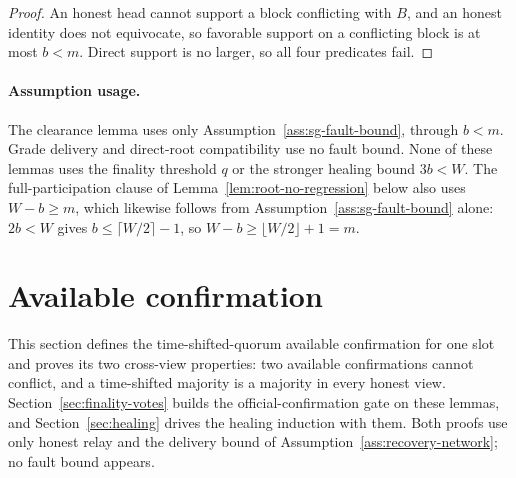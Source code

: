 \begin{proof}
An honest head cannot support a block conflicting with \(B\), and an
honest identity does not equivocate, so favorable support on a conflicting
block is at most \(b<m\).  Direct support is no larger, so all four
predicates fail.
\end{proof}

\paragraph{Assumption usage.}
The clearance lemma uses only
Assumption~\ref{ass:sg-fault-bound}, through \(b<m\).  Grade delivery and
direct-root compatibility use no fault bound.  None of these lemmas uses
the finality threshold \(q\) or the stronger healing bound \(3b<W\).
The full-participation clause of
Lemma~\ref{lem:root-no-regression} below also uses
\(W-b\geq m\), which likewise follows from
Assumption~\ref{ass:sg-fault-bound} alone: \(2b<W\) gives
\(b\leq\lceil W/2\rceil-1\), so
\(W-b\geq\lfloor W/2\rfloor+1=m\).

\section{Available confirmation}\label{sec:available-confirmation}

This section defines the time-shifted-quorum available confirmation for one
slot and proves its two cross-view properties: two available confirmations
cannot conflict, and a time-shifted majority is a majority in every honest
view.  Section~\ref{sec:finality-votes} builds the official-confirmation
gate on these lemmas, and Section~\ref{sec:healing} drives the healing
induction with them.  Both proofs use only honest relay and the delivery
bound of Assumption~\ref{ass:recovery-network}; no fault bound appears.

